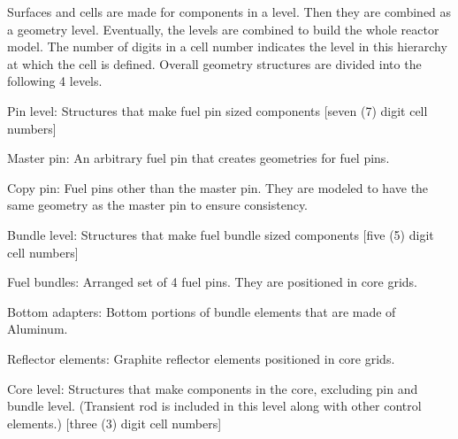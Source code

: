 \documentclass{UWNR_modeling}
\begin{document}
Surfaces and cells are made for components in a level. Then they are combined as a geometry level. Eventually, the levels are combined to build the whole reactor model.  The number of digits in a cell number indicates the level in this hierarchy at which the cell is defined.  Overall geometry structures are divided into the following 4 levels.
\begin{myenumerate}
\item Pin level: Structures that make fuel pin sized components [seven (7) digit cell numbers]

	\begin{myitemize}
	\item Master pin: An arbitrary fuel pin that creates geometries for fuel pins.
	\item Copy pin: Fuel pins other than the master pin. They are modeled to have the same geometry as the master pin to ensure consistency.
	\end{myitemize}
\item Bundle level: Structures that make fuel bundle sized components [five (5) digit cell numbers]

	\begin{myitemize}
	\item Fuel bundles: Arranged set of 4 fuel pins. They are positioned in core grids.
	\item Bottom adapters: Bottom portions of bundle elements that are made of Aluminum.
	\item Reflector elements: Graphite reflector elements positioned in core grids.
	\end{myitemize}
\item Core level: Structures that make components in the core, excluding pin and bundle level. (Transient rod is included in this level along with other control elements.) [three (3) digit cell numbers]


\end{myenumerate}
\end{document}
